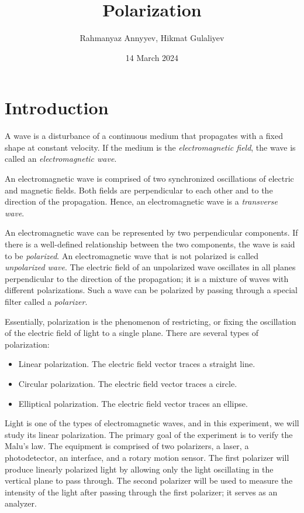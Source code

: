 \documentclass[10pt]{article}
\title{Polarization}
\author{Rahmanyaz Annyyev, Hikmat Gulaliyev}
\date{14 March 2024}
\newcommand{\td}[1]{\todo[linecolor=blue, backgroundcolor=blue!25,bordercolor=blue, size=\small]{#1}}
\begin{document}
\maketitle

\begin{abstract}

\end{abstract}

\section{Introduction}

\td{Add some references.}

A wave is a disturbance of a continuous medium that propagates with a fixed shape at constant velocity. If the medium is the \textit{electromagnetic field}, the wave is called an \textit{electromagnetic wave}. 

An electromagnetic wave is comprised of two synchronized oscillations of electric and magnetic fields. Both fields are perpendicular to each other and to the direction of the propagation. Hence, an electromagnetic wave is a \textit{transverse wave}.

An electromagnetic wave can be represented by two perpendicular components. If there is a well-defined relationship between the two components, the wave is said to be \textit{polarized}. An electromagnetic wave that is not polarized is called \textit{unpolarized wave}. The electric field of an unpolarized wave oscillates in all planes perpendicular to the direction of the propagation; it is a mixture of waves with different polarizations. Such a wave can be polarized by passing through a special filter called a \textit{polarizer}.

Essentially, polarization is the phenomenon of restricting, or fixing the oscillation of the electric field of light to a single plane. There are several types of polarization:
\begin{itemize}
  \item Linear polarization. The electric field vector traces a straight line.
  \item Circular polarization. The electric field vector traces a circle.
  \item Elliptical polarization. The electric field vector traces an ellipse.
\end{itemize}

Light is one of the types of electromagnetic waves, and in this experiment, we will study its linear polarization. The primary goal of the experiment is to verify the Malu's law. The equipment is comprised of two polarizers, a laser, a photodetector, an interface, and a rotary motion sensor. The first polarizer will produce linearly polarized light by allowing only the light oscillating in the vertical plane to pass through. The second polarizer will be used to measure the intensity of the light after passing through the first polarizer; it serves as an analyzer.
\end{document}

